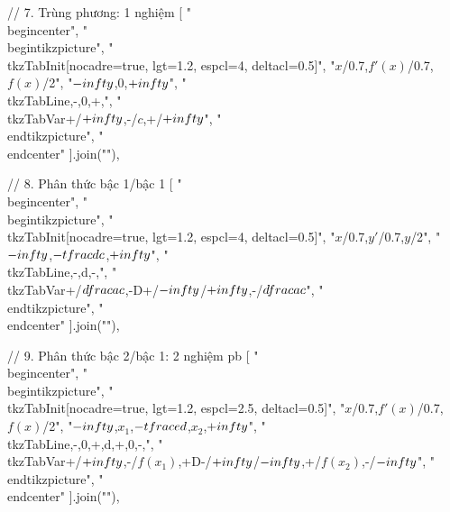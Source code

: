 // 7. Trùng phương: 1 nghiệm
[
"\\begin{center}",
"\\begin{tikzpicture}",
"\\tkzTabInit[nocadre=true, lgt=1.2, espcl=4, deltacl=0.5]",
"{$x$/0.7,$f'(x)$/0.7,$f(x)$/2}",
"{$-\\infty$,$0$,$+\\infty$}",
"\\tkzTabLine{,-,0,+,}",
"\\tkzTabVar{+/$+\\infty$,-/$c$,+/$+\\infty$}",
"\\end{tikzpicture}",
"\\end{center}"
].join("\n"),

// 8. Phân thức bậc 1/bậc 1
[
"\\begin{center}",
"\\begin{tikzpicture}",
"\\tkzTabInit[nocadre=true, lgt=1.2, espcl=4, deltacl=0.5]",
"{$x$/0.7,$y'$/0.7,$y$/2}",
"{$-\\infty$,$-\\tfrac{d}{c}$,$+\\infty$}",
"\\tkzTabLine{,-,d,-,}",
"\\tkzTabVar{+/$\\dfrac{a}{c}$,-D+/$-\\infty$/$+\\infty$,-/$\\dfrac{a}{c}$}",
"\\end{tikzpicture}",
"\\end{center}"
].join("\n"),

// 9. Phân thức bậc 2/bậc 1: 2 nghiệm pb
[
"\\begin{center}",
"\\begin{tikzpicture}",
"\\tkzTabInit[nocadre=true, lgt=1.2, espcl=2.5, deltacl=0.5]",
"{$x$/0.7,$f'(x)$/0.7,$f(x)$/2}",
"{$-\\infty$,$x_1$,$-\\tfrac{e}{d}$,$x_2$,$+\\infty$}",
"\\tkzTabLine{,-,0,+,d,+,0,-,}",
"\\tkzTabVar{+/$+\\infty$,-/$f(x_1)$,+D-/$+\\infty$/$-\\infty$,+/$f(x_2)$,-/$-\\infty$}",
"\\end{tikzpicture}",
"\\end{center}"
].join("\n"),

